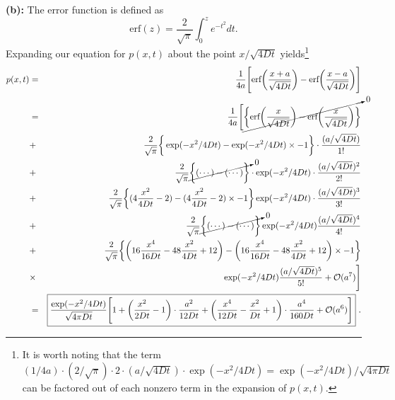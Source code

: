 \textbf{(b):} The error function is defined as
\begin{equation}
\text{erf}(z) = \frac{2}{\sqrt{\pi}} \int_{0}^{z} e^{-t^2} dt.
\end{equation}
Expanding our equation for $p(x, t)$ about the point $x/\sqrt{4Dt}$ yields\footnote{It is worth noting that the term $(1/4a) \cdot (2/\sqrt{\pi}) \cdot 2 \cdot (a/\sqrt{4 D t}) \cdot \exp(-x^2/4Dt) = \exp(-x^2/4Dt)/\sqrt{4 \pi D t} $ can be factored out of each nonzero term in the expansion of $p(x,t)$.}
\begin{eqnarray}
p(x, t) &=& \frac{1}{4a} \Bigg[ \text{erf}\bigg(\frac{x+a}{\sqrt{4 D t}}\bigg) - \text{erf}\bigg(\frac{x-a}{\sqrt{4 D t}}\bigg)\Bigg]  \nonumber \\
&=& \frac{1}{4a} \Bigg[ \cancelto{0}{\bigg\{ \text{erf}\bigg(\frac{x}{\sqrt{4 D t}}\bigg) - \text{erf}\bigg(\frac{x}{\sqrt{4 D t}}\bigg) \bigg\}}  \nonumber \\ 
&+& \frac{2}{\sqrt{\pi}} \bigg\{ \exp(-x^2/4Dt) -\exp(-x^2/4Dt)  \times -1 \bigg\} \cdot \frac{(a/\sqrt{4 D t})}{1!}  \nonumber \\
&+& \frac{2}{\sqrt{\pi}} \cancelto{0}{\bigg\{ (\cdots) - (\cdots) \bigg\}} \cdot \exp(-x^2/4Dt) \cdot \frac{(a/\sqrt{4 D t})^2}{2!}  \nonumber \\
&+& \frac{2}{\sqrt{\pi}} \bigg\{ (4 \frac{x^2}{4Dt}-2) - (4 \frac{x^2}{4Dt}-2) \times -1 \bigg\} \exp(-x^2/4Dt) \cdot \frac{(a/\sqrt{4 D t})^3}{3!}  \nonumber \\
&+& \frac{2}{\sqrt{\pi}} \cancelto{0}{\bigg\{ (\cdots) - (\cdots) \bigg\}} \exp(-x^2/4Dt) \frac{(a/\sqrt{4 D t})^4}{4!}  \nonumber \\
&+& \frac{2}{\sqrt{\pi}} \bigg\{ \bigg( 16 \frac{x^4}{16 D t} - 48 \frac{x^2}{4 D t} + 12\bigg) - \bigg( 16 \frac{x^4}{16 D t} - 48 \frac{x^2}{4 D t} + 12\bigg) \times -1 \bigg\} \nonumber \\
&\times& \exp(-x^2/4Dt) \frac{(a/\sqrt{4 D t})^5}{5!} + \mathcal{O}(a^7) \Bigg] \nonumber \\
&=& \boxed{\frac{\exp(-x^2/4Dt)}{\sqrt{4 \pi D t}} \Bigg[ 1 + \bigg(\frac{x^2}{2 D t} -1 \bigg) \cdot \frac{a^2}{12 D t} 
+ \bigg(\frac{x^4}{12 D t} -\frac{x^2}{D t} + 1 \bigg) \cdot \frac{a^4}{160 D t} + \mathcal{O}(a^6) \Bigg]}~. \nonumber
\end{eqnarray}

